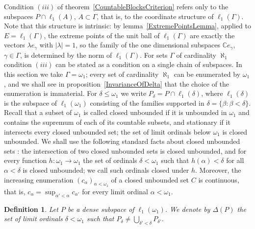 \documentclass[12pt]{article}
\newtheorem{definition}[theorem]{Definition}
\newcommand{\ellone}[1]{\ell_1(#1)}
\begin{document}
Condition $(iii)$ of theorem~\ref{CountableBlocksCriterion} refers only to the
subspaces $P\cap\ellone{A}$, $A\subset\Gamma$, that is, to the coordinate
structure of $\ellone{\Gamma}$. Note that this structure is intrinsic: by
lemma~\ref{ExtremePointsLemma}, applied to $E=\ellone{\Gamma}$, the extreme
points of the unit ball of $\ellone{\Gamma}$ are exactly the vectors
$\lambda e_\gamma$ with $|\lambda|=1$, so the family of the one dimensional
subspaces $\mathbb{C}e_\gamma$, $\gamma\in\Gamma$, is determined by the norm
of $\ellone{\Gamma}$. For sets $\Gamma$ of cardinality $\aleph_1$ condition
$(iii)$ can be stated as a condition on a single chain of subspaces. In this
section we take $\Gamma=\omega_1$; every set
of cardinality $\aleph_1$ can be enumerated by $\omega_1$, and we shall see in
proposition~\ref{InvarianceOfDelta} that the choice of the enumeration is
immaterial. For $\delta\leq\omega_1$ we write $P_\delta=P\cap\ellone{\delta}$,
where $\ellone{\delta}$ is the subspace of $\ellone{\omega_1}$ consisting of
the families supported in $\delta=\{\beta:\beta<\delta\}$. Recall that a
subset of $\omega_1$ is called closed unbounded if it is unbounded in
$\omega_1$ and contains the supremum of each of its countable subsets, and
stationary if it intersects every closed unbounded set; the set of limit
ordinals below $\omega_1$ is closed unbounded. We shall use the following
standard facts about closed unbounded sets \cite[chapter 8]{JechSetTheory}: the intersection of two closed unbounded
sets is closed unbounded, and for every function $h:\omega_1\to\omega_1$ the
set of ordinals $\delta<\omega_1$ such that $h(\alpha)<\delta$ for all
$\alpha<\delta$ is closed unbounded; we call such ordinals closed under $h$.
Moreover, the increasing enumeration ${(c_\alpha)}_{\alpha<\omega_1}$ of a
closed unbounded set $C$ is continuous, that is,
$c_\alpha=\sup_{\alpha'<\alpha}c_{\alpha'}$ for every limit ordinal
$\alpha<\omega_1$.

\begin{definition}\label{DefDelta} Let $P$ be a dense subspace of
    $\ellone{\omega_1}$. We denote by $\Delta(P)$ the set of limit ordinals
    $\delta<\omega_1$ such that $P_\delta\neq\bigcup_{\delta'<\delta}P_{\delta'}$.
\end{definition}
\end{document}
